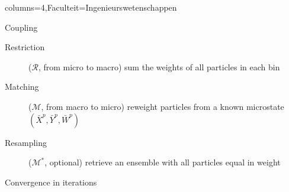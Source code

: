 \documentclass[landscape,a0paper,fontscale=0.45]{kuleuvenposter}
\begin{document}
\begin{poster}{columns=4,Faculteit=Ingenieurswetenschappen}
\begin{posterbox}[name=macroscopic, column=1,row=0, above=parareal micro-macro]{Coupling}
\begin{description}
\item[Restriction]($\mathcal{R}$, from micro to macro) sum the weights of all particles in each bin
\item[Matching]($\mathcal{M}$, from macro to micro) reweight particles from a known microstate $(\bar{X}^p, \bar{Y}^p, \bar{W}^p)$
\item[Resampling]($\mathcal{M}^*$, optional) retrieve an ensemble with all particles equal in weight
\end{description}
\end{posterbox}

\begin{posterbox}[name=convergenceK, column=2, below=notset, above=bottom, borderColor=KULeuvenFaculteit]{Convergence in iterations}%
\end{posterbox}


\end{poster}
\end{document}
